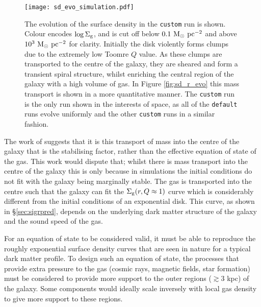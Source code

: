 \begin{figure}[ht]
    \texttt{[image: sd\_evo\_simulation.pdf]}
    \caption{The evolution of the surface density in the {\tt custom} run is shown. Colour encodes $\log\Sigma_\mathrm{g}$, and is cut off below $0.1 ~\mathrm{M}_{\odot} ~\mathrm{pc}^{-2}$ and above $10^3 ~\mathrm{M}_{\odot} ~\mathrm{pc}^{-2}$ for clarity. Initially the disk violently forms clumps due to the extremely low Toomre $Q$ value. As these clumps are transported to the centre of the galaxy, they are sheared and form a transient spiral structure, whilst enriching the central region of the galaxy with a high volume of gas. In Figure \ref{fig:sd_r_evo} this mass transport is shown in a more quantitative manner. The {\tt custom} run is the only run shown in the interests of space, as all of the {\tt default} runs evolve uniformly and the other {\tt custom} runs in a similar fashion.}
    \label{fig:sd_evo_small}
\end{figure}

The work of \citet{krumholz_is_2016} suggests that it is this transport of mass into the centre of the galaxy that is the stabilising factor, rather than the effective equation of state of the gas.
This work would dispute that; whilst there is mass transport into the centre of the galaxy this is only because in simulations the initial conditions do not fit with the galaxy being marginally stable.
The gas is transported into the centre such that the galaxy can fit the $\Sigma_\mathrm{g}(r, Q \approx 1)$ curve which is considerably different from the initial conditions of an exponential disk.
This curve, as shown in \S \ref{sec:sigrpred}, depends on the underlying dark matter structure of the galaxy and the sound speed of the gas.

For an equation of state to be considered valid, it must be able to reproduce the roughly exponential surface density curves that are seen in nature for a typical dark matter profile.
To design such an equation of state, the processes that provide extra pressure to the gas (cosmic rays, magnetic fields, star formation) must be considered to provide more support to the outer regions ($\gtrsim 3$ kpc) of the galaxy.
Some components would ideally scale inversely with local gas density to give more support to these regions.

